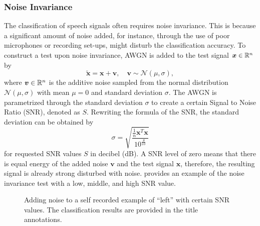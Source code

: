 \subsubsection{Noise Invariance}
The classification of speech signals often requires noise invariance.
This is because a significant amount of noise added, for instance, through the use of poor microphones or recording set-ups, might disturb the classification accuracy.
To construct a test upon noise invariance, AWGN is added to the test signal $\bm{x} \in \mathbb{R}^n$ by
\begin{equation}
  \bm{\tilde{x}} = \bm{x} + \bm{v}, \quad \bm{v} \sim \mathcal{N}(\mu, \sigma),
\end{equation}
where $\bm{v} \in \mathbb{R}^n$ is the additive noise sampled from the normal distribution $\mathcal{N}(\mu, \sigma)$ with mean $\mu = 0$ and standard deviation $\sigma$.
The AWGN is parametrized through the standard deviation $\sigma$ to create a certain Signal to Noise Ratio (SNR), denoted as $S$.
Rewriting the formula of the SNR, the standard deviation can be obtained by
\begin{equation}
  \sigma = \sqrt{\frac{\frac{1}{n}\bm{x}^T \bm{x}}{10^{\frac{S}{10}}}}
\end{equation}
for requested SNR values $S$ in decibel (dB).
A SNR level of zero means that there is equal energy of the added noise $\bm{v}$ and the test signal $\bm{x}$, therefore, the resulting signal is already strong disturbed with noise.
 provides an example of the noise invariance test with a low, middle, and high SNR value.
\begin{figure}[!ht]
  \centering
    \quad
  \caption{Adding noise to a self recorded example of \enquote{left} with certain SNR values. The classification results are provided in the title annotations.}
  \label{fig:exp_details_tb_noise_left}
\end{figure}
